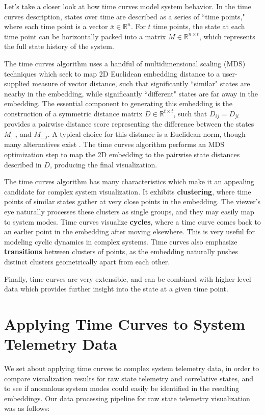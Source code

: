 Let's take a closer look at how time curves model system behavior. In the time curves description, states over time are described as a series of ``time points," where each time point is a vector $\bar{x} \in \mathbb{R}^{n}$. For $t$ time points, the state at each time point can be horizontally packed into a matrix $M \in \mathbb{R}^{n \times t}$, which represents the full state history of the system.

The time curves algorithm uses a handful of multidimensional scaling (MDS) techniques which seek to map 2D Euclidean embedding distance to a user-supplied measure of vector distance, such that significantly ``similar" states are nearby in the embedding, while significantly ``different" states are far away in the embedding. The essential component to generating this embedding is the construction of a symmetric distance matrix $D \in \mathbb{R}^{t \times t}$, such that $D_{ij} = D_{ji}$ provides a pairwise distance score representing the difference between the states $M_{:,i}$ and $M_{:,j}$. A typical choice for this distance is a Euclidean norm, though many alternatives exist \cite{bach2016time}. The time curves algorithm performs an MDS optimization step to map the 2D embedding to the pairwise state distances described in $D$, producing the final visualization.

The time curves algorithm has many characteristics which make it an appealing candidate for complex system visualization. It exhibits \textbf{clustering}, where time points of similar states gather at very close points in the embedding. The viewer's eye naturally processes these clusters as single groups, and they may easily map to system modes. Time curves visualize \textbf{cycles}, where a time curve comes back to an earlier point in the embedding after moving elsewhere. This is very useful for modeling cyclic dynamics in complex systems. Time curves also emphasize \textbf{transitions} between clusters of points, as the embedding naturally pushes distinct clusters geometrically apart from each other.

Finally, time curves are very extensible, and can be combined with higher-level data which provides further insight into the state at a given time point.

\section{Applying Time Curves to System Telemetry Data}

We set about applying time curves to complex system telemetry data, in order to compare visualization results for raw state telemetry and correlative states, and to see if anomalous system modes could easily be identified in the resulting embeddings. Our data processing pipeline for raw state telemetry visualization was as follows:


